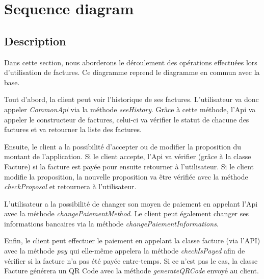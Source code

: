 \section{Sequence diagram}
\subsection{Description}

\begin{flushleft}
Dans cette section, nous aborderons le déroulement des opérations effectuées lors d'utilisation de factures. Ce diagramme reprend le diagramme en commun avec la base.
\end{flushleft}

\begin{flushleft}
Tout d'abord, la client peut voir l'historique de ses factures. L'utilisateur va donc appeler \emph{CommonApi} via la méthode \emph{seeHistory}. Grâce à cette méthode, l'Api va appeler le constructeur de factures, celui-ci va vérifier le statut de chacune des factures et va retourner la liste des factures.
\end{flushleft}

\begin{flushleft}
Ensuite, le client a la possibilité d'accepter ou de modifier la proposition du montant de l'application. Si le client accepte, l'Api va vérifier (grâce à la classe Facture) si la facture est payée pour ensuite retourner à l'utilisateur. Si le client modifie la proposition, la nouvelle proposition va être vérifiée avec la méthode \emph{checkProposal} et retournera à l'utilisateur.
\end{flushleft}

\begin{flushleft}
L'utilisateur a la possibilité de changer son moyen de paiement en appelant l'Api avec la méthode \emph{changePaiementMethod}. Le client peut également changer ses informations bancaires via la méthode \emph{changePaiementInformations}.
\end{flushleft}

\begin{flushleft}
Enfin, le client peut effectuer le paiement en appelant la classe facture (via l'API) avec la méthode \emph{pay} qui elle-même appelera la méthode \emph{checkIsPayed} afin de vérifier si la facture n'a pas été payée entre-temps. Si ce n'est pas le cas, la classe Facture générera un QR Code avec la méthode \emph{generateQRCode} envoyé au client.
\end{flushleft}

